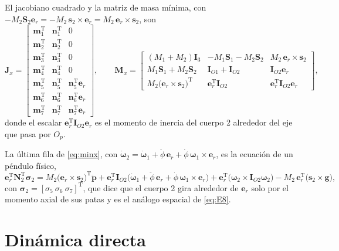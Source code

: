 \documentclass[11pt]{article}
\newcommand{\T}{^{\mathrm{T}}}
\newcommand{\pvec}{\mathbf{p}}
\newcommand{\Nmat}{\mathbf{N}}
\newcommand{\wv}{\boldsymbol{\omega}}
\newcommand{\sig}{\boldsymbol{\sigma}}
\newcommand{\IO}[1]{\mathbf{I}_{O#1}}
\begin{document}
El jacobiano cuadrado y la matriz de masa mínima, con $-M_2\mathbf{S}_2\mathbf{e}_r=-M_2\,\mathbf{s}_2\times\mathbf{e}_r=M_2\,\mathbf{e}_r\times\mathbf{s}_2$, son
\begin{equation}
\mathbf{J}_x=
\begin{bmatrix}
\mathbf{m}_1\T & \mathbf{n}_1\T & 0\\
\mathbf{m}_2\T & \mathbf{n}_2\T & 0\\
\mathbf{m}_3\T & \mathbf{n}_3\T & 0\\
\mathbf{m}_4\T & \mathbf{n}_4\T & 0\\
\mathbf{m}_5\T & \mathbf{n}_5\T & \mathbf{n}_5\T\mathbf{e}_r\\
\mathbf{m}_6\T & \mathbf{n}_6\T & \mathbf{n}_6\T\mathbf{e}_r\\
\mathbf{m}_7\T & \mathbf{n}_7\T & \mathbf{n}_7\T\mathbf{e}_r
\end{bmatrix},
\qquad
\mathbf{M}_x=
\begin{bmatrix}
(M_1+M_2)\mathbf{I}_3 & -M_1\mathbf{S}_1-M_2\mathbf{S}_2 & M_2\,\mathbf{e}_r\times\mathbf{s}_2\\
M_1\mathbf{S}_1+M_2\mathbf{S}_2 & \IO{1}+\IO{2} & \IO{2}\mathbf{e}_r\\
M_2\big(\mathbf{e}_r\times\mathbf{s}_2\big)\T & \mathbf{e}_r\T\IO{2} & \mathbf{e}_r\T\IO{2}\mathbf{e}_r
\end{bmatrix},
\label{eq:Jx7}
\end{equation}
donde el escalar $\mathbf{e}_r\T\IO{2}\mathbf{e}_r$ es el momento de inercia del cuerpo 2 alrededor del eje que pasa por $O_p$.

La última fila de \eqref{eq:minx}, con $\dot{\wv}_2=\dot{\wv}_1+\ddot\phi\,\mathbf{e}_r+\dot\phi\,\wv_1\times\mathbf{e}_r$, es la ecuación de un péndulo físico,
\begin{equation}
\mathbf{e}_r\T\Nmat_2\T\sig_2
=M_2\big(\mathbf{e}_r\times\mathbf{s}_2\big)\T\ddot{\pvec}
+\mathbf{e}_r\T\IO{2}\big(\dot{\wv}_1+\ddot\phi\,\mathbf{e}_r+\dot\phi\,\wv_1\times\mathbf{e}_r\big)
+\mathbf{e}_r\T\big(\wv_2\times\IO{2}\wv_2\big)
-M_2\,\mathbf{e}_r\T\big(\mathbf{s}_2\times\mathbf{g}\big),
\label{eq:pendulo}
\end{equation}
con $\sig_2=[\sigma_5\ \sigma_6\ \sigma_7]\T$, que dice que el cuerpo 2 gira alrededor de $\mathbf{e}_r$ solo por el momento axial de sus patas y es el análogo espacial de \eqref{eq:E8}.

\section{Dinámica directa}
\end{document}
